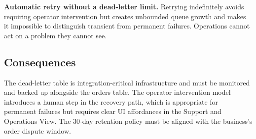\textbf{Automatic retry without a dead-letter limit.} Retrying indefinitely avoids requiring
operator intervention but creates unbounded queue growth and makes it impossible to distinguish
transient from permanent failures. Operations cannot act on a problem they cannot see.

\subsection{Consequences}

The dead-letter table is integration-critical infrastructure and must be monitored and backed
up alongside the orders table. The operator intervention model introduces a human step in the
recovery path, which is appropriate for permanent failures but requires clear UI affordances
in the Support and Operations View. The 30-day retention policy must be aligned with the
business's order dispute window.
